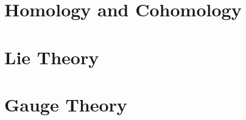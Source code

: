 \documentclass[english,a5paper]{book}%
\begin{document}
\clearpage
\part{Homology and Cohomology}\label{Part II}



\clearpage
\part{Lie Theory \texorpdfstring{\ucmark}{}}\label{part Lie Theory}




\clearpage
\part{Gauge Theory \texorpdfstring{\ucmark}{}}\label{Part III}




\clearpage
{}
% 


\setlength\bibhang{0pt} %
\setlength\bibitemsep{2pt} %
\printbibliography[heading=bibintoc]

\printindex
\end{document}

